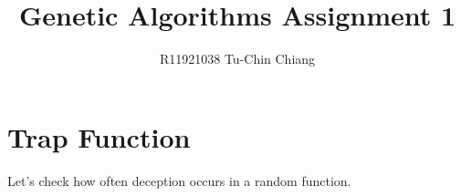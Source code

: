 \documentclass{article}
\title{\textbf{Genetic Algorithms Assignment 1}}
\author{R11921038 Tu-Chin Chiang}
\begin{document}
      
\maketitle



\section{Trap Function}

Let’s check how often deception occurs in a random function.

\end{document}
